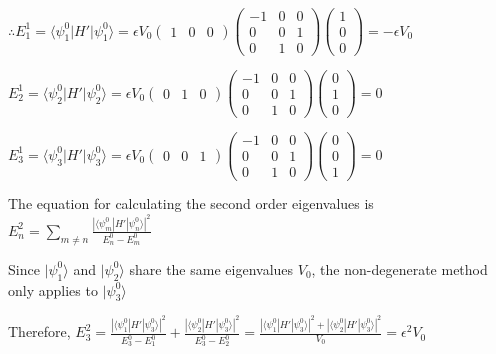 \documentclass[12pt]{article}
\begin{document}
\begin{spacing}{2.0}
$\therefore E_1^1=\langle \psi_1^0 |H'| \psi_1^0 \rangle = \epsilon V_0\left(
\begin{array}{ccc}
1 & 0 & 0
\end{array}
\right)\left(
\begin{array}{ccc}
-1 & 0 & 0 \\
0  & 0 & 1 \\
0  & 1 & 0
\end{array}
\right)
\left(
\begin{array}{c}
1 \\
0 \\
0
\end{array}
\right)= -\epsilon V_0$

$E_2^1=\langle \psi_2^0 |H'| \psi_2^0 \rangle = \epsilon V_0\left(
\begin{array}{ccc}
0 & 1 & 0
\end{array}
\right)\left(
\begin{array}{ccc}
-1 & 0 & 0 \\
0  & 0 & 1 \\
0  & 1 & 0
\end{array}
\right)
\left(
\begin{array}{c}
0 \\
1 \\
0
\end{array}
\right)= 0$

$E_3^1=\langle \psi_3^0 |H'| \psi_3^0 \rangle = \epsilon V_0\left(
\begin{array}{ccc}
0 & 0 & 1
\end{array}
\right)\left(
\begin{array}{ccc}
-1 & 0 & 0 \\
0  & 0 & 1 \\
0  & 1 & 0
\end{array}
\right)
\left(
\begin{array}{c}
0 \\
0 \\
1
\end{array}
\right)= 0$

The equation for calculating the second order eigenvalues is $E_n^2=\sum_{m \ne n} \frac{|\langle \psi_m^0|H'| \psi_n^0 \rangle|^2}{E_n^0-E_m^0}$

Since $| \psi_1^0 \rangle$ and $| \psi_2^0 \rangle$ share the same eigenvalues $V_0$, the non-degenerate method only applies to $| \psi_3^0 \rangle$

Therefore, $E_3^2=\frac{|\langle \psi_1^0|H'| \psi_3^0 \rangle|^2}{E_3^0-E_1^0}+ \frac{|\langle \psi_2^0|H'| \psi_3^0 \rangle|^2}{E_3^0-E_2^0}= \frac{|\langle \psi_1^0|H'| \psi_3^0 \rangle|^2 + |\langle \psi_2^0|H'| \psi_3^0 \rangle|^2}{V_0}= \epsilon^2 V_0$


\end{spacing}
\end{document}
